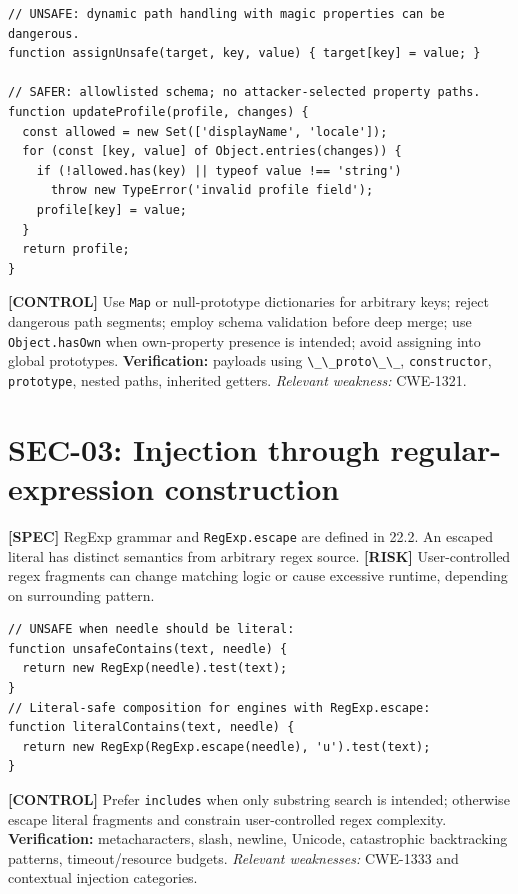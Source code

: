 \documentclass[11pt,letterpaper]{article}
\newcommand{\passthrough}[1]{#1}
\begin{document}
\begin{lstlisting}
// UNSAFE: dynamic path handling with magic properties can be dangerous.
function assignUnsafe(target, key, value) { target[key] = value; }

// SAFER: allowlisted schema; no attacker-selected property paths.
function updateProfile(profile, changes) {
  const allowed = new Set(['displayName', 'locale']);
  for (const [key, value] of Object.entries(changes)) {
    if (!allowed.has(key) || typeof value !== 'string')
      throw new TypeError('invalid profile field');
    profile[key] = value;
  }
  return profile;
}
\end{lstlisting}

\textbf{{[}CONTROL{]}} Use \passthrough{\lstinline!Map!} or null-prototype dictionaries for arbitrary keys; reject dangerous path segments; employ schema validation before deep merge; use \passthrough{\lstinline!Object.hasOwn!} when own-property presence is intended; avoid assigning into global prototypes. \textbf{Verification:} payloads using \passthrough{\lstinline!\_\_proto\_\_!}, \passthrough{\lstinline!constructor!}, \passthrough{\lstinline!prototype!}, nested paths, inherited getters. \emph{Relevant weakness:} CWE-1321.

\section{SEC-03: Injection through regular-expression construction}\label{sec-03-injection-through-regular-expression-construction}

\textbf{{[}SPEC{]}} RegExp grammar and \passthrough{\lstinline!RegExp.escape!} are defined in 22.2. An escaped literal has distinct semantics from arbitrary regex source. \textbf{{[}RISK{]}} User-controlled regex fragments can change matching logic or cause excessive runtime, depending on surrounding pattern.

\begin{lstlisting}
// UNSAFE when needle should be literal:
function unsafeContains(text, needle) {
  return new RegExp(needle).test(text);
}
// Literal-safe composition for engines with RegExp.escape:
function literalContains(text, needle) {
  return new RegExp(RegExp.escape(needle), 'u').test(text);
}
\end{lstlisting}

\textbf{{[}CONTROL{]}} Prefer \passthrough{\lstinline!includes!} when only substring search is intended; otherwise escape literal fragments and constrain user-controlled regex complexity. \textbf{Verification:} metacharacters, slash, newline, Unicode, catastrophic backtracking patterns, timeout/resource budgets. \emph{Relevant weaknesses:} CWE-1333 and contextual injection categories.
\end{document}
